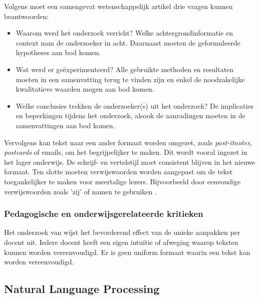 Volgens \textcite{Hollenkamp2020, McCombes2022} moet een samengevat wetenschappelijk artikel drie vragen kunnen beantwoorden: 

\begin{itemize}
	\item Waarom werd het onderzoek verricht? Welke achtergrondinformatie en context nam de onderzoeker in acht. Daarnaast moeten de geformuleerde hypotheses aan bod komen.
	\item Wat werd er geëxperimenteerd? Alle gebruikte methoden en resultaten moeten in een samenvatting terug te vinden zijn en enkel de noodzakelijke kwalitatieve waarden mogen aan bod komen.
	\item Welke conclusies trekken de onderzoeker(s) uit het onderzoek? De implicaties en beperkingen tijdens het onderzoek, alsook de aanradingen moeten in de samenvattingen aan bod komen.
\end{itemize}

Vervolgens kan tekst naar een ander formaat worden omgezet, zoals \textit{post-itnotes}, \textit{postcards} of emails, om het begrijpelijker te maken. Dit wordt vooral ingezet in het lager onderwijs. De schrijf- en vertelstijl moet consistent blijven in het nieuwe formaat. Ten slotte moeten verwijswoorden worden aangepast om de tekst toegankelijker te maken voor meertalige lezers. Bijvoorbeeld door eenvoudige verwijswoorden zoals 'zij' of namen te gebruiken \autocite{Rijkhoff2022}. 

\subsubsection{Pedagogische en onderwijsgerelateerde kritieken}

Het onderzoek van \textcite{Crossley2012} wijst het bevorderend effect van de unieke aanpakken per docent uit. Iedere docent heeft een eigen intuïtie of afweging waarop teksten kunnen worden vereenvoudigd. Er is geen uniform formaat waarin een tekst kan worden vereenvoudigd. 

\subsection{Natural Language Processing}

